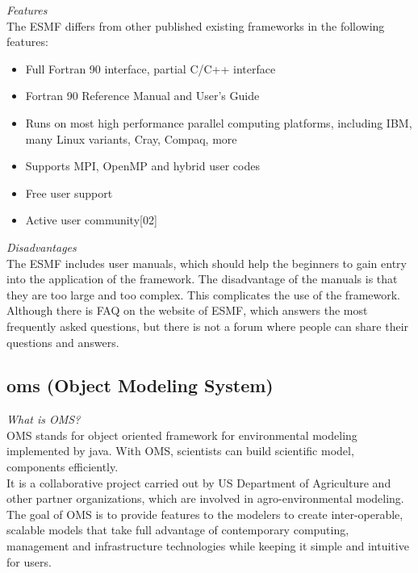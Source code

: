 \emph{Features}\\
The ESMF differs from other published existing frameworks in the following features:
\begin{itemize}
	\item Full Fortran 90 interface, partial C/C++ interface
	\item Fortran 90 Reference Manual and User's Guide
	\item Runs on most high performance parallel computing platforms, including IBM, many Linux variants, Cray, Compaq, more
	\item Supports MPI, OpenMP and hybrid user codes
	\item Free user support
	\item Active user community[02]
\end{itemize}

\emph{Disadvantages}\\
The ESMF includes user manuals, which should help the beginners to gain entry into the application of the framework. The disadvantage of the manuals is that they are too large and too complex. This complicates the use of the framework.
Although there is FAQ on the website of ESMF, which answers the most frequently asked questions, but there is not a forum where people can share their questions and answers.

\subsection{oms (Object Modeling System)}
\emph{What is OMS?}\\
OMS stands for object oriented framework for environmental modeling implemented by java. With OMS, scientists can build scientific model, components efficiently.\\
It is a collaborative project carried out by US Department of Agriculture and other partner organizations, which are involved in agro-environmental modeling. The goal of OMS is to provide features to the modelers to create inter-operable, scalable models that take full advantage of contemporary computing, management and infrastructure technologies while keeping it simple and intuitive for users.

